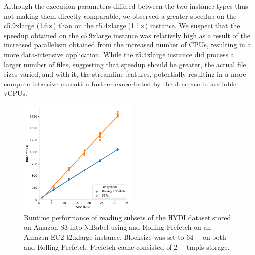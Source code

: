 Although the execution parameters differed between the two instance types thus
not making them directly comparable, we observed a greater speedup on the
c5.9xlarge (1.6$\times$) than on the r5.4xlarge (1.1$\times$) instance. We
suspect that the speedup obtained on the c5.9xlarge instance was relatively high
as a result of the increased parallelism obtained from the increased number of
CPUs, resulting in a more data-intensive application. While the r5.4xlarge
instance did process a larger number of files, suggesting that speedup should be
greater, the actual file sizes varied, and with it, the streamline features,
potentially resulting in a more compute-intensive execution further exacerbated
by the decrease in available vCPUs. 





\begin{figure}
\begin{center}
\includegraphics[height=160pt]{figures/rp/filesize.pdf}
\caption{Runtime performance of reading subsets of the HYDI dataset stored on
Amazon S3 into NiBabel using \sfs and Rolling Prefetch on an Amazon EC2
t2.xlarge instance. Blocksize was set to \SI{64}{\mebi\byte} on both \sfs and
Rolling Prefetch. Prefetch cache consisted of \SI{2}{\gibi\byte} tmpfs storage.}
\label{fig:rp:filesize}
\end{center}
\end{figure}

